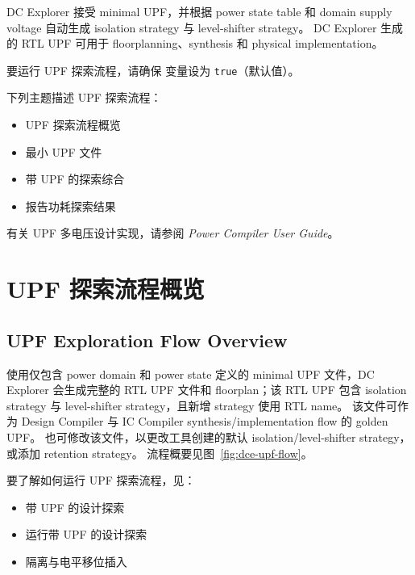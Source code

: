 \label{chap:upf}

DC Explorer 接受 minimal UPF，并根据 power state table 和 domain supply voltage 自动生成 isolation strategy 与 level-shifter strategy。
DC Explorer 生成的 RTL UPF 可用于 floorplanning、synthesis 和 physical implementation。

要运行 UPF 探索流程，请确保  变量设为 \texttt{true}（默认值）。

下列主题描述 UPF 探索流程：
\begin{itemize}
  \item UPF 探索流程概览
  \item 最小 UPF 文件
  \item 带 UPF 的探索综合
  \item 报告功耗探索结果
\end{itemize}

有关 UPF 多电压设计实现，请参阅 \textit{Power Compiler User Guide}。

\section{UPF 探索流程概览}
\subsection*{UPF Exploration Flow Overview}

使用仅包含 power domain 和 power state 定义的 minimal UPF 文件，DC Explorer 会生成完整的 RTL UPF 文件和 floorplan；该 RTL UPF 包含 isolation strategy 与 level-shifter strategy，且新增 strategy 使用 RTL name。
该文件可作为 Design Compiler 与 IC Compiler synthesis/implementation flow 的 golden UPF。
也可修改该文件，以更改工具创建的默认 isolation/level-shifter strategy，或添加 retention strategy。
流程概要见图~\ref{fig:dce-upf-flow}。


要了解如何运行 UPF 探索流程，见：
\begin{itemize}
  \item 带 UPF 的设计探索
  \item 运行带 UPF 的设计探索
  \item 隔离与电平移位插入
\end{itemize}

